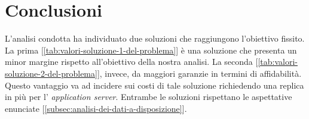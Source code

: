 \documentclass[../main.tex]{subfiles}
\begin{document}
    \chapter{Conclusioni}\label{ch:conclusioni}
    L'analisi condotta ha individuato due soluzioni che raggiungono l'obiettivo fissito.
    La prima [\ref{tab:valori-soluzione-1-del-problema}] è una soluzione che presenta un minor margine rispetto
    all'obiettivo della nostra analisi. La seconda [\ref{tab:valori-soluzione-2-del-problema}], invece, da maggiori
    garanzie in termini di affidabilità.
    Questo vantaggio va ad incidere sui costi di tale soluzione richiedendo una replica in più per l'
    \textit{application server}.
    Entrambe le soluzioni rispettano le aspettative enunciate [\ref{subsec:analisi-dei-dati-a-disposizione}].
\end{document}
